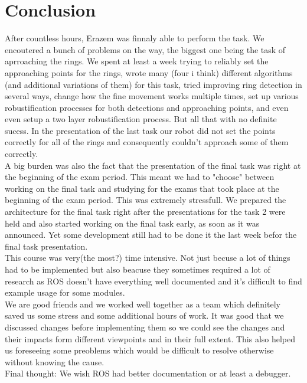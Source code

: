 \documentclass[12pt,a4paper]{article}
\begin{document}
	\section{Conclusion}
	After countless hours, Erazem was finnaly able to perform the task. We encoutered a bunch of problems on the way, the biggest one being the task of aprroaching the rings. We spent at least a week trying to reliably set the approaching points for the rings, wrote many (four i think) different algorithms (and additional variations of them) for this task, tried improving ring detection in several ways, change how the fine movement works multiple times, set up various robustification processes for both detections and approaching points, and even even setup a two layer robustification process. But all that with no definite sucess. In the presentation of the last task our robot did not set the points correctly for all of the rings and consequently couldn't approach some of them correctly. \\

	A big burden was also the fact that the presentation of the final task was right at the beginning of the exam period. This meant we had to "choose" between working on the final task and studying for the exams that took place at the beginning of the exam period. This was extremely stressfull. We prepared the architecture for the final task right after the presentations for the task 2 were held and also started working on the final task early, as soon as it was announced. Yet some development still had to be done it the last week befor the final task presentation. \\
	
	This course was very(the most?) time intensive. Not just becuse a lot of things had to be implemented but also beacuse they sometimes required a lot of research as ROS doesn't have everything well documented and it's difficult to find example usage for some modules. \\

	We are good friends and we worked well together as a team which definitely saved us some stress and some additional hours of work. It was good that we discussed changes before implementing them so we could see the changes and their impacts form different viewpoints and in their full extent. This also helped us foreseeing some preoblems which would be difficult to resolve otherwise without knowing the cause. \\

	Final thought: We wish ROS had better documentation or at least a debugger.


	
\end{document}
